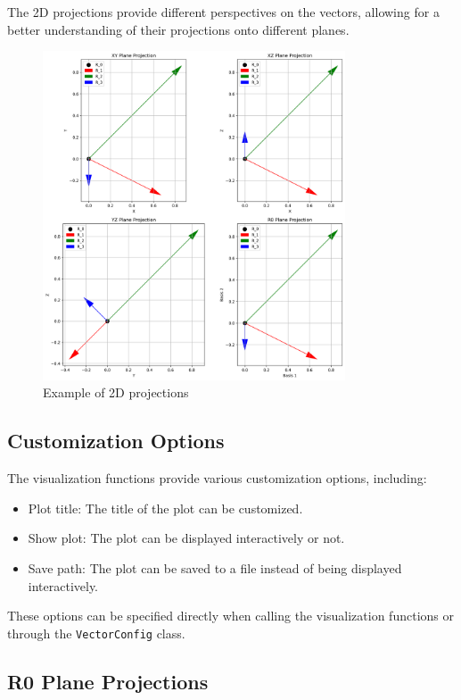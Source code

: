 The 2D projections provide different perspectives on the vectors, allowing for a better understanding of their projections onto different planes.

\begin{figure}[H]
    \centering
    \includegraphics[width=0.8\textwidth]{figures/2d_projections.png}
    \caption{Example of 2D projections}
    \label{fig:vis_2d_projections}
\end{figure}

\subsection{Customization Options}

The visualization functions provide various customization options, including:

\begin{itemize}
    \item Plot title: The title of the plot can be customized.
    \item Show plot: The plot can be displayed interactively or not.
    \item Save path: The plot can be saved to a file instead of being displayed interactively.
\end{itemize}

These options can be specified directly when calling the visualization functions or through the \texttt{VectorConfig} class.

\subsection{R0 Plane Projections}

